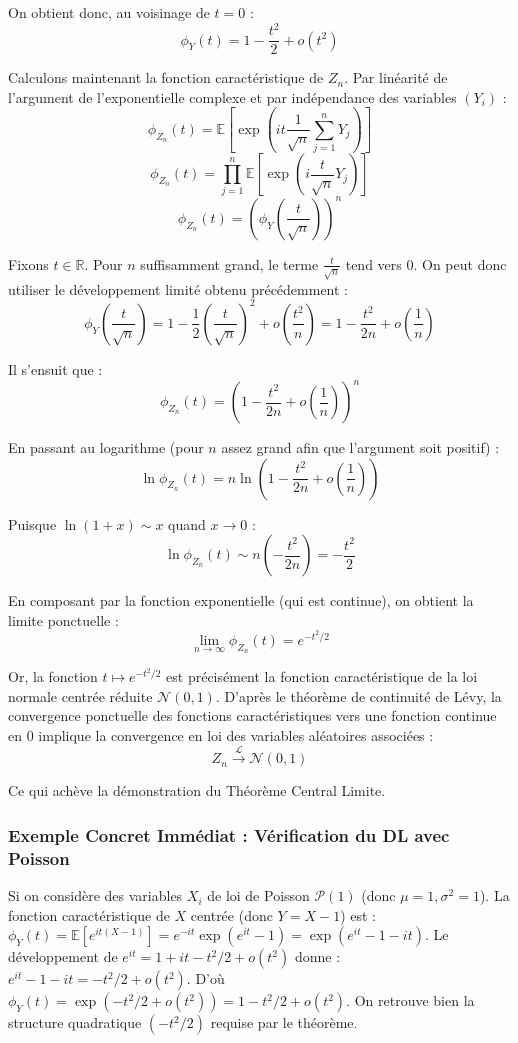\documentclass[11pt,a4paper]{article}
\begin{document}
On obtient donc, au voisinage de $t=0$ :
$$\phi_Y(t) = 1 - \frac{t^2}{2} + o(t^2)$$

Calculons maintenant la fonction caractéristique de $Z_n$.
Par linéarité de l'argument de l'exponentielle complexe et par indépendance des variables $(Y_i)$ :
$$\phi_{Z_n}(t) = \mathbb{E}\left[ \exp\left( it \frac{1}{\sqrt{n}} \sum_{j=1}^n Y_j \right) \right]$$
$$\phi_{Z_n}(t) = \prod_{j=1}^n \mathbb{E}\left[ \exp\left( i \frac{t}{\sqrt{n}} Y_j \right) \right]$$
$$\phi_{Z_n}(t) = \left( \phi_Y\left( \frac{t}{\sqrt{n}} \right) \right)^n$$

Fixons $t \in \mathbb{R}$. Pour $n$ suffisamment grand, le terme $\frac{t}{\sqrt{n}}$ tend vers $0$. On peut donc utiliser le développement limité obtenu précédemment :
$$\phi_Y\left( \frac{t}{\sqrt{n}} \right) = 1 - \frac{1}{2} \left(\frac{t}{\sqrt{n}}\right)^2 + o\left( \frac{t^2}{n} \right) = 1 - \frac{t^2}{2n} + o\left( \frac{1}{n} \right)$$

Il s'ensuit que :
$$\phi_{Z_n}(t) = \left( 1 - \frac{t^2}{2n} + o\left( \frac{1}{n} \right) \right)^n$$

En passant au logarithme (pour $n$ assez grand afin que l'argument soit positif) :
$$\ln \phi_{Z_n}(t) = n \ln\left( 1 - \frac{t^2}{2n} + o\left( \frac{1}{n} \right) \right)$$

Puisque $\ln(1 + x) \sim x$ quand $x \to 0$ :
$$\ln \phi_{Z_n}(t) \sim n \left( - \frac{t^2}{2n} \right) = - \frac{t^2}{2}$$

En composant par la fonction exponentielle (qui est continue), on obtient la limite ponctuelle :
$$\lim_{n \to \infty} \phi_{Z_n}(t) = e^{-t^2/2}$$

Or, la fonction $t \mapsto e^{-t^2/2}$ est précisément la fonction caractéristique de la loi normale centrée réduite $\mathcal{N}(0, 1)$.
D'après le théorème de continuité de Lévy, la convergence ponctuelle des fonctions caractéristiques vers une fonction continue en $0$ implique la convergence en loi des variables aléatoires associées :
$$Z_n \xrightarrow{\mathcal{L}} \mathcal{N}(0, 1)$$

Ce qui achève la démonstration du Théorème Central Limite.

\subsubsection{Exemple Concret Immédiat : Vérification du DL avec Poisson}

Si on considère des variables $X_i$ de loi de Poisson $\mathcal{P}(1)$ (donc $\mu=1, \sigma^2=1$).
La fonction caractéristique de $X$ centrée (donc $Y = X-1$) est :
$\phi_Y(t) = \mathbb{E}[e^{it(X-1)}] = e^{-it} \exp(e^{it} - 1) = \exp(e^{it} - 1 - it)$.
Le développement de $e^{it} = 1 + it - t^2/2 + o(t^2)$ donne :
$e^{it} - 1 - it = -t^2/2 + o(t^2)$.
D'où $\phi_Y(t) = \exp(-t^2/2 + o(t^2)) = 1 - t^2/2 + o(t^2)$.
On retrouve bien la structure quadratique $(-t^2/2)$ requise par le théorème.
\end{document}
